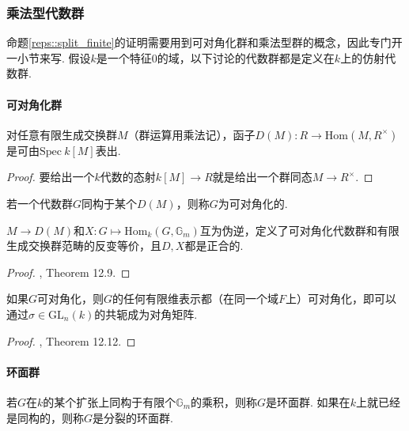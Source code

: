 \subsubsection{乘法型代数群}

命题\ref{reps::split_finite}的证明需要用到可对角化群和乘法型群的概念，因此专门开一小节来写.
假设$k$是一个特征$0$的域，以下讨论的代数群都是定义在$k$上的仿射代数群.

\paragraph*{可对角化群}

\begin{cprop}
    对任意有限生成交换群$M$（群运算用乘法记），函子$D(M): R\to \mathrm{Hom}(M, R^{\times})$是可由$\mathrm{Spec}\ k[M]$表出.
\end{cprop}

\begin{proof}
    要给出一个$k$代数的态射$k[M]\to R$就是给出一个群同态$M\to R^{\times}$.
\end{proof}

\begin{cdef}
    若一个代数群$G$同构于某个$D(M)$，则称$G$为可对角化的.
\end{cdef}

\begin{cprop}
    $M\to D(M)$和$X: G\mapsto \mathrm{Hom}_k(G, \mathbb{G}_m)$互为伪逆，定义了可对角化代数群和有限生成交换群范畴的反变等价，且$D,X$都是正合的.
\end{cprop}

\begin{proof}
    \cite{milne2017algebraic}, Theorem 12.9.
\end{proof}

\begin{cprop}
    如果$G$可对角化，则$G$的任何有限维表示都（在同一个域$F$上）可对角化，即可以通过$\sigma\in\mathrm{GL}_n(k)$的共轭成为对角矩阵.
\end{cprop}

\begin{proof}
    \cite{milne2017algebraic}, Theorem 12.12.
\end{proof}

\paragraph*{环面群}

\begin{cdef}
    若$G$在$k$的某个扩张上同构于有限个$\mathbb{G}_m$的乘积，则称$G$是环面群. 如果在$k$上就已经是同构的，则称$G$是分裂的环面群.
\end{cdef}

